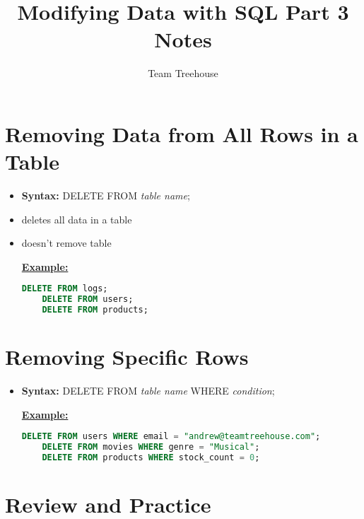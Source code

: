 \documentclass[12pt]{article}
\begin{document}
\title{Modifying Data with SQL Part 3 Notes}
\author{Team Treehouse}
\maketitle

\bigskip

\section{Removing Data from All Rows in a Table}

\bigskip

\begin{itemize}
    \item \textbf{Syntax:} DELETE FROM \textit{table name};
    \item deletes all data in a table
    \item doesn't remove table

    \bigskip

    \underline{\textbf{Example:}}

    \bigskip

    \begin{lstlisting}[language=SQL]
    DELETE FROM logs;
    DELETE FROM users;
    DELETE FROM products;
    \end{lstlisting}
\end{itemize}

\bigskip

\section{Removing Specific Rows}

\bigskip


\begin{itemize}
    \item \textbf{Syntax:} DELETE FROM \textit{table name} WHERE \textit{condition};

    \bigskip

    \underline{\textbf{Example:}}

    \bigskip

    \begin{lstlisting}[language=SQL]
    DELETE FROM users WHERE email = "andrew@teamtreehouse.com";
    DELETE FROM movies WHERE genre = "Musical";
    DELETE FROM products WHERE stock_count = 0;
    \end{lstlisting}

\end{itemize}


\bigskip

\section{Review and Practice}

\bigskip
\end{document}
